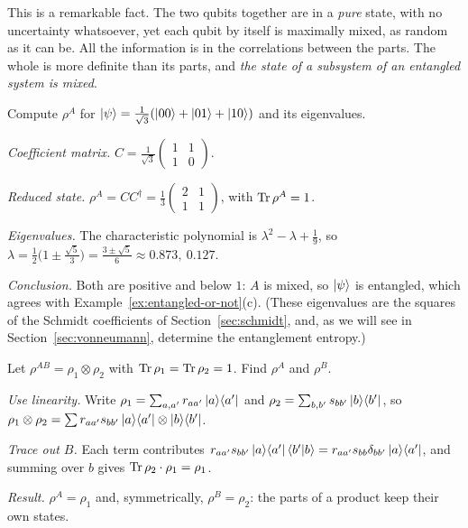 This is a remarkable fact. The two qubits together are in a \emph{pure} state, with no uncertainty whatsoever, yet each qubit by itself is maximally mixed, as random as it can be. All the information is in the correlations between the parts. The whole is more definite than its parts, and \emph{the state of a subsystem of an entangled system is mixed}.

\begin{example}\label{ex:reduced-3term}
  Compute $\rho^A$ for $\left|\psi\right\rangle=\frac1{\sqrt3}(\left|00\right\rangle+\left|01\right\rangle+\left|10\right\rangle)$ and its eigenvalues.
\end{example}
\begin{solution}
  \begin{steps}
    \item \emph{Coefficient matrix.} $C=\frac1{\sqrt3}\begin{pmatrix}1&1\\1&0\end{pmatrix}$.
    \item \emph{Reduced state.} $\rho^A=CC^\dagger=\tfrac13\begin{pmatrix}2&1\\1&1\end{pmatrix}$, with $\operatorname{Tr}\rho^A=1$.
    \item \emph{Eigenvalues.} The characteristic polynomial is $\lambda^2-\lambda+\tfrac19$, so $\lambda=\tfrac12\bigl(1\pm\tfrac{\sqrt5}3\bigr)=\tfrac{3\pm\sqrt5}6\approx0.873,\ 0.127$.
    \item \emph{Conclusion.} Both are positive and below $1$: $A$ is mixed, so $\left|\psi\right\rangle$ is entangled, which agrees with Example~\ref{ex:entangled-or-not}(c). (These eigenvalues are the squares of the Schmidt coefficients of Section~\ref{sec:schmidt}, and, as we will see in Section~\ref{sec:vonneumann}, determine the entanglement entropy.)
  \end{steps}
\end{solution}

\begin{example}\label{ex:reduced-product}
  Let $\rho^{AB}=\rho_1\otimes\rho_2$ with $\operatorname{Tr}\rho_1=\operatorname{Tr}\rho_2=1$. Find $\rho^A$ and $\rho^B$.
\end{example}
\begin{solution}
  \begin{steps}
    \item \emph{Use linearity.} Write $\rho_1=\sum_{a,a'}r_{aa'}\left|a\right\rangle\!\left\langle a'\right|$ and $\rho_2=\sum_{b,b'}s_{bb'}\left|b\right\rangle\!\left\langle b'\right|$, so $\rho_1\otimes\rho_2=\sum r_{aa'}s_{bb'}\left|a\right\rangle\!\left\langle a'\right|\otimes\left|b\right\rangle\!\left\langle b'\right|$.
    \item \emph{Trace out $B$.} Each term contributes $r_{aa'}s_{bb'}\left|a\right\rangle\!\left\langle a'\right|\left\langle b'\middle|b\right\rangle=r_{aa'}s_{bb}\delta_{bb'}\left|a\right\rangle\!\left\langle a'\right|$, and summing over $b$ gives $\operatorname{Tr}\rho_2\cdot\rho_1=\rho_1$.
    \item \emph{Result.} $\rho^A=\rho_1$ and, symmetrically, $\rho^B=\rho_2$: the parts of a product keep their own states.
  \end{steps}
\end{solution}

